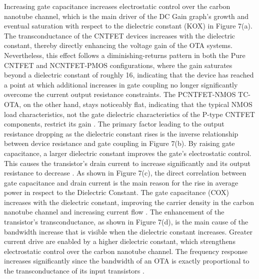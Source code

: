 Increasing gate capacitance increases electrostatic control over the carbon
nanotube channel, which is the main driver of the DC Gain graph's growth and
eventual saturation with respect to the dielectric constant (KOX) in Figure
7(a). The transconductance of the CNTFET devices increases with the dielectric
constant, thereby directly enhancing the voltage gain of the OTA systems.
Nevertheless, this effect follows a diminishing-returns pattern in both the Pure
CNTFET and NCNTFET-PMOS configurations, where the gain saturates beyond a
dielectric constant of roughly 16, indicating that the device has reached a
point at which additional increases in gate coupling no longer significantly
overcome the current output resistance constraints. The PCNTFET-NMOS TC-OTA, on
the other hand, stays noticeably flat, indicating that the typical NMOS load
characteristics, not the gate dielectric characteristics of the P-type CNTFET
components, restrict its gain \cite{ref41,ref42}.
The primary factor leading to the output resistance dropping as the dielectric
constant rises is the inverse relationship between device resistance and gate
coupling in Figure 7(b). By raising gate capacitance, a larger dielectric
constant improves the gate's electrostatic control. This causes the transistor's
drain current to increase significantly and its output resistance to decrease
\cite{ref43,ref44}.
As shown in Figure 7(c), the direct correlation between gate capacitance and
drain current is the main reason for the rise in average power in respect to the
Dielectric Constant. The gate capacitance (COX) increases with the dielectric
constant, improving the carrier density in the carbon nanotube channel and
increasing current flow \cite{ref7}.
The enhancement of the transistor's transconductance, as shown in Figure 7(d),
is the main cause of the bandwidth increase that is visible when the dielectric
constant increases. Greater current drive are enabled by a higher dielectric
constant, which strengthens electrostatic control over the carbon nanotube
channel. The frequency response increases significantly since the bandwidth of
an OTA is exactly proportional to the transconductance of its input transistors
\cite{ref39,ref44,ref45}.

